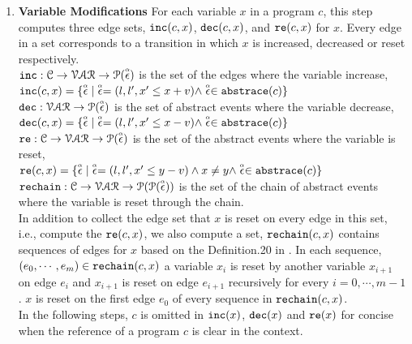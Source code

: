 \begin{enumerate}
\item \textbf{Variable Modifications}
For each variable $x$ in a program $c$, this step computes three edge sets, $\mathtt{inc}(c, x)$, $\mathtt{dec}(c, x)$,
and $\mathtt{re}(c, x)$ for $x$.
Every edge in a set corresponds to a transition in which $x$ is increased,
decreased
or reset
respectively.
\\
$\mathtt{inc}: \mathcal{C} \to \mathcal{VAR} \to \mathcal{P}(\stackrel{\scriptscriptstyle{\alpha}}{\mathtt{\epsilon}{}}) $
is the set of the edges where the variable increase, 
\\
$\mathtt{inc}(c, x) = \{ \stackrel{\scriptscriptstyle{\alpha}}{\mathtt{\epsilon}{}} | \stackrel{\scriptscriptstyle{\alpha}}{\mathtt{\epsilon}{}} = (l, l', x' \leq x + v) \land \stackrel{\scriptscriptstyle{\alpha}}{\mathtt{\epsilon}{}} \in \mathtt{abs}{\mathtt{trace}}(c)\}$
\\
$\mathtt{dec}: \mathcal{VAR} \to \mathcal{P}(\stackrel{\scriptscriptstyle{\alpha}}{\mathtt{\epsilon}{}}) $
is the set of abstract events where the variable decrease,
\\
$\mathtt{dec}(c, x) = \{\stackrel{\scriptscriptstyle{\alpha}}{\mathtt{\epsilon}{}}| \stackrel{\scriptscriptstyle{\alpha}}{\mathtt{\epsilon}{}} = (l, l', x' \leq x - v) \land \stackrel{\scriptscriptstyle{\alpha}}{\mathtt{\epsilon}{}} \in \mathtt{abs}{\mathtt{trace}}(c)\}$
\\
$\mathtt{re}: \mathcal{C} \to \mathcal{VAR} \to \mathcal{P}(\stackrel{\scriptscriptstyle{\alpha}}{\mathtt{\epsilon}{}}) $
is the set of the abstract events where the variable is reset,
\\
$\mathtt{re}(c, x) = \{\stackrel{\scriptscriptstyle{\alpha}}{\mathtt{\epsilon}{}}| \stackrel{\scriptscriptstyle{\alpha}}{\mathtt{\epsilon}{}} = (l, l', x' \leq y - v) \land x \neq y \land \stackrel{\scriptscriptstyle{\alpha}}{\mathtt{\epsilon}{}} \in \mathtt{abs}{\mathtt{trace}}(c)\}$
\\
$\mathtt{rechain}: \mathcal{C} \to \mathcal{VAR} \to \mathcal{P}(\mathcal{P}(\stackrel{\scriptscriptstyle{\alpha}}{\mathtt{\epsilon}{}})) $
is the set of the chain of abstract events where the variable is reset through the chain.
\\
In addition to
collect the edge set that $x$ is reset on every edge in this set, i.e., compute the $\mathtt{re}(c, x)$,
we also compute a set, $\mathtt{rechain}(c, x)$ contains sequences of edges for $x$
based on the Definition.20 in \cite{sinn2017complexity}.
In each sequence, $(e_0, \cdots, e_m) \in \mathtt{rechain}(c, x)$
a variable $x_i$ is reset by another variable $x_{i + 1}$ on edge $e_{i}$
and $x_{i + 1}$ is reset on edge $e_{i + 1}$ recursively
for every $i = 0, \cdots, m - 1$.
$x$ is reset on the first edge $e_0$ of every sequence in $\mathtt{rechain}(c, x)$.
%
\\
In the following steps, $c$ is omitted in $\mathtt{inc}(x)$,
$\mathtt{dec}(x)$ and $\mathtt{re}(x)$ for concise when the reference of a program $c$ is clear in the context.

\end{enumerate}
